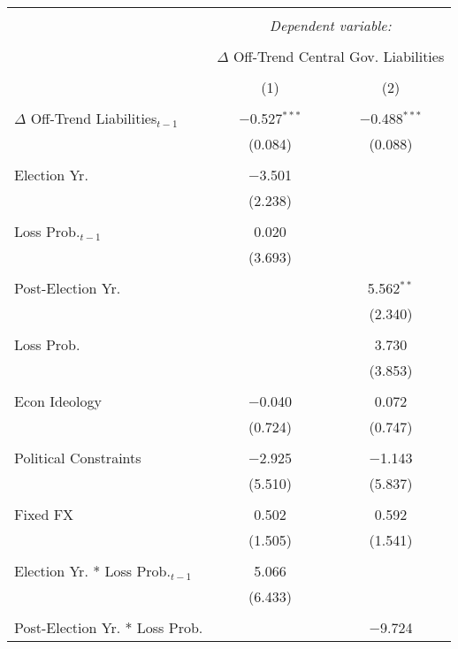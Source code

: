 
\begingroup 
\tiny 
\begin{tabular}{@{\extracolsep{5pt}}lcc} 
\\[-1.8ex]\hline 
\hline \\[-1.8ex] 
 & \multicolumn{2}{c}{\textit{Dependent variable:}} \\ 
\cline{2-3} 
\\[-1.8ex] & \multicolumn{2}{c}{$\Delta$ Off-Trend Central Gov. Liabilities} \\ 
\\[-1.8ex] & (1) & (2)\\ 
\hline \\[-1.8ex] 
 $\Delta$ Off-Trend Liabilities$_{t-1}$ & $-$0.527$^{***}$ & $-$0.488$^{***}$ \\ 
  & (0.084) & (0.088) \\ 
  & & \\ 
 Election Yr. & $-$3.501 &  \\ 
  & (2.238) &  \\ 
  & & \\ 
 Loss Prob.$_{t-1}$ & 0.020 &  \\ 
  & (3.693) &  \\ 
  & & \\ 
 Post-Election Yr. &  & 5.562$^{**}$ \\ 
  &  & (2.340) \\ 
  & & \\ 
 Loss Prob. &  & 3.730 \\ 
  &  & (3.853) \\ 
  & & \\ 
 Econ Ideology & $-$0.040 & 0.072 \\ 
  & (0.724) & (0.747) \\ 
  & & \\ 
 Political Constraints & $-$2.925 & $-$1.143 \\ 
  & (5.510) & (5.837) \\ 
  & & \\ 
 Fixed FX & 0.502 & 0.592 \\ 
  & (1.505) & (1.541) \\ 
  & & \\ 
 Election Yr. * Loss Prob.$_{t-1}$ & 5.066 &  \\ 
  & (6.433) &  \\ 
  & & \\ 
 Post-Election Yr. * Loss Prob. &  & $-$9.724 \\ 

\end{tabular}
